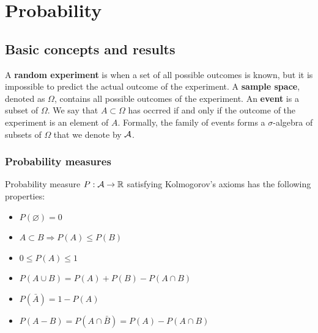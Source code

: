 \chapter{Probability}

\section{Basic concepts and results}

A \textbf{random experiment} is when a set of all possible outcomes is known, but it is impossible to predict the actual outcome of the experiment.
A \textbf{sample space}, denoted as $\Omega$, contains all possible outcomes of the experiment.
An \textbf{event} is a subset of $\Omega$. We say that $A\subset\Omega$ has occrred if and only if the outcome of the experiment is an element of $A$. 
Formally, the family of events forms a $\sigma$-algebra of subsets of $\Omega$ that we denote by $\mathcal{A}$.
\subsection{Probability measures}

Probability measure $P: \mathcal{A}\to\mathbb{R}$ satisfying Kolmogorov's axioms has the following properties:
\begin{itemize}
    \item $P(\varnothing) = 0$
    \item $A\subset B\Rightarrow P(A) \leq P(B)$
    \item $0\leq P(A)\leq 1$
    \item $P(A\cup B) = P(A) + P(B) - P(A\cap B)$
    \item $P(\bar{A}) = 1 - P(A)$
    \item $P(A-B) = P(A\cap \bar{B}) = P(A) - P(A\cap B)$
\end{itemize}

